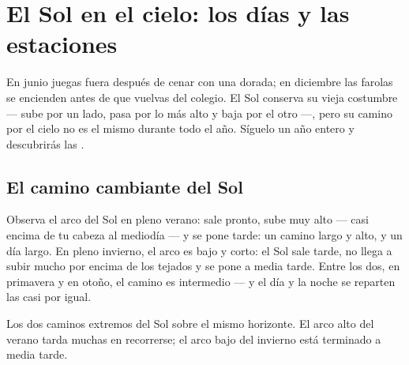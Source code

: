 \chapter{El Sol en el cielo: los días y las estaciones}\label{ch:g3:sun-days-seasons}

En junio juegas fuera después de cenar con una  dorada; en
diciembre las farolas se encienden antes de que vuelvas del colegio.
El Sol conserva su vieja costumbre --- sube por un lado, pasa por lo
más alto y baja por el otro ---, pero su camino por el cielo no es el
mismo durante todo el año. Síguelo un año entero y descubrirás las
.

\section{El camino cambiante del Sol}

\begin{example}\label{ex:g3:sun-days-seasons:roads}
Observa el arco del Sol en pleno verano: sale pronto, sube muy alto
--- casi encima de tu cabeza al mediodía --- y se pone tarde: un
camino largo y alto, y un día largo. En pleno invierno, el arco es
bajo y corto: el Sol sale tarde, no llega a subir mucho por encima de
los tejados y se pone a media tarde. Entre los dos, en primavera y en
otoño, el camino es intermedio --- y el día y la noche se reparten las
 casi por igual.
\end{example}

\begin{omfigure}

{\small Los dos caminos extremos del Sol sobre el mismo horizonte. El
arco alto del verano tarda muchas  en recorrerse; el arco bajo
del invierno está terminado a media tarde.}
\end{omfigure}

